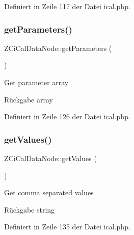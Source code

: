 Definiert in Zeile 117 der Datei ical.\+php.

\mbox{\label{class_z_ci_cal_data_node_a80e75525c0013a5c13a84e6952828120}} 
\subsubsection{\texorpdfstring{get\+Parameters()}{getParameters()}}
{\footnotesize\ttfamily Z\+Ci\+Cal\+Data\+Node\+::get\+Parameters (\begin{DoxyParamCaption}{ }\end{DoxyParamCaption})}

Get parameter array

\begin{DoxyReturn}{Rückgabe}
array 
\end{DoxyReturn}


Definiert in Zeile 126 der Datei ical.\+php.

\mbox{\label{class_z_ci_cal_data_node_a1c4e81aef52c5ec62a3e562b9216bb11}} 
\subsubsection{\texorpdfstring{get\+Values()}{getValues()}}
{\footnotesize\ttfamily Z\+Ci\+Cal\+Data\+Node\+::get\+Values (\begin{DoxyParamCaption}{ }\end{DoxyParamCaption})}

Get comma separated values

\begin{DoxyReturn}{Rückgabe}
string 
\end{DoxyReturn}


Definiert in Zeile 135 der Datei ical.\+php.

\mbox{\label{class_z_ci_cal_data_node_a9fde88b87dde333e65376b91311459d4}} 
